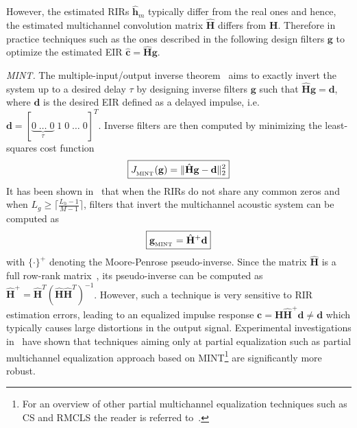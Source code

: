 \documentclass{article}
\begin{document}
However, the estimated RIRs $\hat{\mathbf{h}}_m$ typically differ from the real ones and hence, the estimated multichannel convolution matrix $\hat{\mathbf{H}}$ differs from $\mathbf{H}$. 
Therefore in practice techniques such as the ones described in the following design filters $\mathbf{g}$ to optimize the estimated EIR $\hat{\mathbf{c}} = \hat{\mathbf{H}}\mathbf{g}$.

\smallskip \noindent \textit{MINT.} \enspace
The multiple-input/output inverse theorem~\cite{Miyoshi_ITASS_1988} aims to exactly invert the system up to a desired delay $\tau$ by designing inverse filters $\mathbf{g}$ such that $\hat{\mathbf{H}}\mathbf{g} = \mathbf{d}$, where $\mathbf{d}$ is the desired EIR defined as a delayed impulse, i.e. $\mathbf{d} = [\underbrace{0 \; \ldots \; 0}_{\tau} \; 1 \; 0 \; \ldots \; 0 ]^T$.
Inverse filters are then computed by minimizing the least-squares cost function
\begin{equation}
\label{eq: ls}
\boxed{J_{_{\rm MINT}}(\mathbf{g}) = \|\hat{\mathbf{H}}\mathbf{g} - \mathbf{d}\|_2^2}
\end{equation}
It has been shown in~\cite{Miyoshi_ITASS_1988} that when the RIRs do not share any common zeros and when $L_g \geq \lceil{\frac{L_h-1}{M-1}\rceil}$, filters that invert the multichannel acoustic system can be computed as
\begin{equation}
  \label{eq: mint}
  \boxed{\mathbf{g}_{{}_{\rm MINT}} = \hat{\mathbf{H}}^+\mathbf{d}}
\end{equation}
with $\{\cdot\}^+$ denoting the Moore-Penrose pseudo-inverse. Since the matrix $\hat{\mathbf{H}}$ is a full row-rank matrix~\cite{Harikumar_ITSP_1998}, its pseudo-inverse can be computed as $\hat{\mathbf{H}}^+ = \hat{\mathbf{H}}^T(\hat{\mathbf{H}}\hat{\mathbf{H}}^T)^{-1}$.
However, such a technique is very sensitive to RIR estimation errors, leading to an equalized impulse response $\mathbf{c} = \mathbf{H}\hat{\mathbf{H}}^+\mathbf{d} \neq \mathbf{d}$ which typically causes large distortions in the output signal.
Experimental investigations in~\cite{Zhang_IWAENC_2010, Kodrasi_ICASSP_2012} have shown that techniques aiming only at partial equalization such as partial multichannel equalization approach based on MINT\footnote{For an overview of other partial multichannel equalization techniques such as CS and RMCLS the reader is referred to~\cite{Kallinger_ICASSP_2006, Zhang_IWAENC_2010, Kodrasi_ICASSP_2012}.} are significantly more robust.
\end{document}
